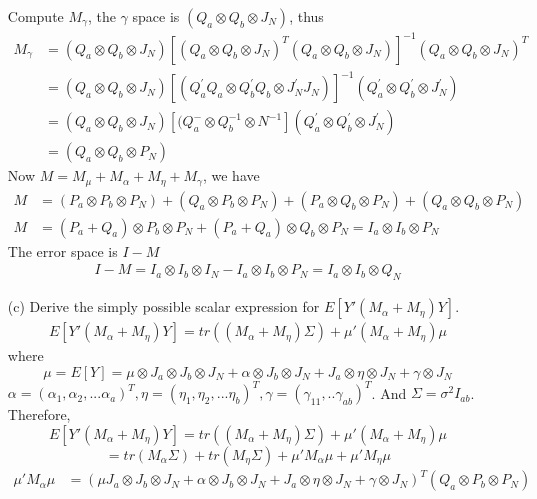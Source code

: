 \begin{itemize}
    Compute $M_\gamma$, the $\gamma$ space is $(Q_a \otimes Q_b \otimes J_N)$, thus
 \begin{align*}
    M_\gamma &= (Q_a \otimes Q_b \otimes J_N) [(Q_a \otimes Q_b \otimes J_N)^{T}(Q_a \otimes Q_b \otimes J_N)]^{-1} (Q_a \otimes Q_b \otimes J_N)^{T}\\
     &= (Q_a \otimes Q_b \otimes J_N) [(Q_a ^{'}Q_a\otimes Q_b^{'}Q_b \otimes J_N^{'}J_N)]^{-1}(Q_a^{'} \otimes Q_b^{'} \otimes J_N^{'})\\
     &= (Q_a \otimes Q_b \otimes J_N) [(Q_a^{-}\otimes Q_b^{-1} \otimes N^{-1}](Q_a^{'} \otimes Q_b^{'} \otimes J_N^{'})\\
     &= (Q_a \otimes Q_b \otimes P_N) 
 \end{align*}
    Now $M = M_{\mu} + M_{\alpha} + M_{\eta} + M_{\gamma}$, we have
 \begin{align*}
     M &=(P_a \otimes P_b \otimes P_N) + (Q_a \otimes P_b \otimes P_N) + (P_a \otimes Q_b \otimes P_N)  + (Q_a \otimes Q_b \otimes P_N) \\
     M &=(P_a + Q_a) \otimes P_b \otimes P_N + (P_a + Q_a) \otimes Q_b \otimes P_N  = I_a \otimes I_b \otimes P_N
 \end{align*}
    The error space is $I-M$
 \begin{align*}
     I-M = I_a \otimes I_b \otimes I_N - I_a \otimes I_b \otimes P_N = I_a \otimes I_b \otimes Q_N
 \end{align*}
    \item[(c)] Derive the simply possible scalar expression for $E[Y'(M_\alpha + M_\eta)Y]$.\\
 \begin{align*}
     E[Y'(M_\alpha + M_\eta)Y] = tr((M_\alpha + M_\eta)\Sigma) + \mu'(M_\alpha + M_\eta)\mu
 \end{align*}
    where
    \[ 
     \mu = E[Y] = \mu \otimes J_a \otimes J_b \otimes J_N + \alpha \otimes J_b \otimes J_N + J_a \otimes \eta \otimes J_N + \gamma \otimes J_N
    \] 
    $\alpha = (\alpha_1, \alpha_2,... \alpha_a)^T, \eta = (\eta_1, \eta_2,... \eta_b)^T, \gamma= (\gamma_{11},.. \gamma_{ab})^T$. And $\Sigma = \sigma^2 I_{ab}$.\\
    Therefore, 
    \[ 
     E[Y'(M_\alpha + M_\eta)Y] = tr((M_\alpha + M_\eta)\Sigma) + \mu'(M_\alpha + M_\eta)\mu 
    \]
    \[ 
     = tr(M_\alpha \Sigma) + tr(M_\eta\Sigma) + \mu'M_\alpha \mu + \mu' M_\eta \mu 
    \]    
 \begin{align*}
     \mu'M_\alpha \mu &= (\mu J_a \otimes J_b \otimes J_N + \alpha \otimes J_b \otimes J_N + J_a \otimes \eta \otimes J_N + \gamma \otimes J_N)^T (Q_a \otimes P_b \otimes P_N)\\

\end{align*}
\end{itemize}

